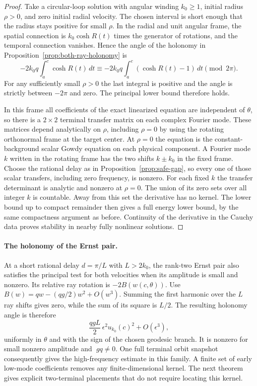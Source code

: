 \begin{proof}
Take a circular-loop solution with angular winding
$k_0\ge1$, initial radius $\rho>0$, and zero initial
radial velocity. The chosen interval is short
enough that the radius stays positive for small
$\rho$.
In the radial and unit angular frame,
the spatial connection is $k_0\cosh R(t)$ times
the generator of rotations, and the temporal
connection vanishes. Hence the angle of the
holonomy in Proposition~\ref{prop:both-ray-holonomy}
is
\[
 -2k_0 q\int_a^c\cosh R(t)\,dt
   \equiv -2k_0q\int_a^c(\cosh R(t)-1)\,dt
                   \pmod{2\pi}.
\]
For any sufficiently small $\rho>0$ the
last integral is positive and the angle
is strictly between $-2\pi$ and zero.
The principal lower bound therefore holds.

In this frame all coefficients of the exact
linearized equation are independent of $\theta$,
so there is a $2\times2$ terminal transfer matrix
on each complex Fourier mode.
These matrices depend analytically on $\rho$,
including $\rho=0$ by using the rotating
orthonormal frame at the target center.
At $\rho=0$ the equation is the constant-background
scalar Gowdy equation on each physical component.
A Fourier mode $k$ written in the rotating frame
has the two shifts $k\pm k_0$ in the fixed frame.
Choose the rational delay as in
Proposition~\ref{prop:safe-gap}, so every one of
those scalar transfers, including zero frequency,
is nonzero. For each fixed $k$ the transfer
determinant is analytic and nonzero at
$\rho=0$. The union of its zero sets over all
integer $k$ is countable.
Away from this set the derivative has no kernel.
The lower bound up to compact remainder then
gives a full energy lower bound, by the same
compactness argument as before.
Continuity of the derivative in the Cauchy
data proves stability in nearby fully nonlinear
solutions.
\end{proof}


\paragraph{The holonomy of the Ernst pair.}
At a short rational delay $d=\pi/L$ with $L>2k_0$,
the rank-two Ernst pair also satisfies the principal
test for both velocities when its amplitude is
small and nonzero.
Its relative ray rotation is $-2B(w(c,\theta))$.
Use $B(w)=q w-(qg/2)w^2+O(w^3)$.
Summing the first harmonic over the $L$ ray shifts
gives zero, while the sum of its square is $L/2$.
The resulting holonomy angle is therefore
\[
 \frac{qgL}{2}\,\epsilon^2u_{k_0}(c)^2+O(\epsilon^3),
\]
uniformly in $\theta$ and with the sign of the
chosen geodesic branch. It is nonzero for small
nonzero amplitude and $\;gq\ne0$.
One full terminal orbit snapshot consequently
gives the high-frequency estimate in this family.
A finite set of early low-mode coefficients
removes any finite-dimensional kernel.
The next theorem gives explicit two-terminal
placements that do not require locating this kernel.


